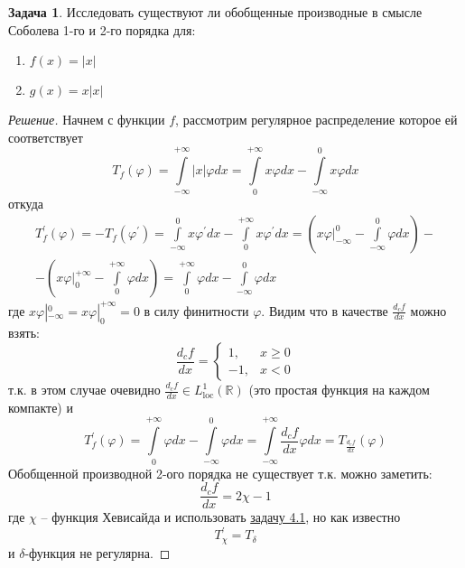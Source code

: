 \documentclass[12pt,a4paper]{article}
\theoremstyle{definition}
\newtheorem{exercise}{Задача}[section]
\newenvironment{solution}
{\renewcommand\qedsymbol{$\blacksquare$}\begin{proof}[Решение]}
{\end{proof}}
\newcommand{\Real}{\mathbb{R}}
\begin{document}
\begin{exercise}
	Исследовать существуют ли обобщенные производные в смысле Соболева 1-го и 2-го порядка для:
	\begin{enumerate}
		\item $f(x) = |x|$
		\item $g(x) = x|x|$
	\end{enumerate}
\end{exercise}
\begin{solution}
	Начнем с функции $f$, рассмотрим регулярное распределение которое ей соответствует
	\begin{equation*}
		T_f (\varphi) = \int\limits_{-\infty}^{+\infty}{|x| \varphi dx} = \int\limits_{0}^{+\infty}{x \varphi dx} - \int\limits_{-\infty}^{0}{x \varphi dx}
	\end{equation*}
	откуда
	\begin{multline*}
		T_f^\prime (\varphi) = -T_f (\varphi^\prime) = \int\limits_{-\infty}^{0}{x \varphi^\prime dx} - \int\limits_{0}^{+\infty}{x \varphi^\prime dx} = \left(x \varphi |_{-\infty}^{0} - \int\limits_{-\infty}^{0}{\varphi dx} \right) - \\ - \left( x \varphi |_{0}^{+\infty} - \int\limits_{0}^{+\infty}{\varphi dx} \right) = \int\limits_{0}^{+\infty}{\varphi dx} - \int\limits_{-\infty}^{0}{\varphi dx}
	\end{multline*}
	где $x \varphi |_{-\infty}^{0} = x \varphi |_{0}^{+\infty} = 0$ в силу финитности $\varphi$. Видим что в качестве $\frac{d_c f}{dx}$ можно взять:
	\begin{equation*}
		\frac{d_c f}{dx} = 
		\begin{cases}
			1, &x \geq 0 \\
			-1, &x < 0
		\end{cases}
	\end{equation*}
	т.к. в этом случае очевидно $\frac{d_c f}{dx} \in L^1_{\text{loc}} (\Real)$ (это простая функция на каждом компакте) и
	\begin{equation*}
		T_f^\prime (\varphi) = \int\limits_{0}^{+\infty}{\varphi dx} - \int\limits_{-\infty}^{0}{\varphi dx} = \int\limits_{-\infty}^{+\infty}{\frac{d_c f}{dx} \varphi dx} = T_{\frac{d_c f}{dx}} (\varphi)
	\end{equation*}
	Обобщенной производной 2-ого порядка не существует т.к. можно заметить:
	\begin{equation*}
		\frac{d_c f}{dx} = 2 \chi - 1
	\end{equation*}
	где $\chi$ -- функция Хевисайда и использовать \hyperref[ex:1]{задачу 4.1}, но как известно
	\begin{equation*}
		T_\chi^\prime = T_\delta
	\end{equation*}
	и $\delta$-функция не регулярна.
	

\end{solution}
\end{document}
